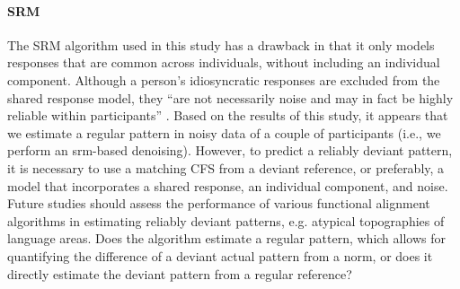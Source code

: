 

\paragraph{SRM}


The SRM algorithm used in this study has a drawback in that it only models
responses that are common across individuals, without including an individual
component.
%
Although a person's idiosyncratic responses are excluded from the shared
response model, they ``are not necessarily noise and may in fact be highly
reliable within participants'' \citep{cohen2017computational}.
%
Based on the results of this study, it appears that we estimate a regular
pattern in noisy data of a couple of participants  (i.e., we perform an
\ac{srm}-based denoising).
%
However, to predict a reliably deviant pattern, it is necessary to use a
matching CFS from a deviant reference, or preferably, a model that incorporates
a shared response, an individual component, and noise.
%
Future studies should assess the performance of various functional alignment
algorithms in estimating reliably deviant patterns, e.g. atypical topographies
of language areas.
%
Does the algorithm estimate a regular pattern, which allows for quantifying the
difference of a deviant actual pattern from a norm, or does it directly estimate
the deviant pattern from a regular reference?



\begin{comment}

\paragraph{SRM and individual differences}
%
``SRM can be used to isolate participant-unique responses by examining the
residuals after removing shared group responses, or it can be applied
hierarchically to the residuals to identify subgroups [\citet{chen2017shared}]
'' \citep{cohen2017computational}.
%
``Recognizing that signal exists beyond the average or shared response of a
group, such studies exploit idiosyncratic but stable responses to account for
previously unexplained variance in brain function, behavioral performance and
clinical measures [e.g., Finn (2015). Functional fingerprinting (based on
connectivity)]'' \citep{cohen2017computational}.
%
``In cases where each subject's unique response is of more interest than the
shared signal, SRM can be used to factor out the shared component thereby
isolating the idiosyncratic response for each subject
[\citep{chen2015reduced}]'' \citep{kumar2020brainiak}.

\end{comment}




